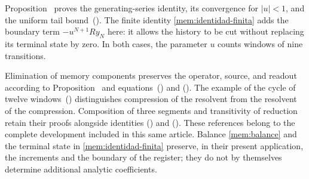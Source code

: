 Proposition~ proves the generating-series
identity, its convergence for \(|u|<1\), and the uniform tail
bound~\textup{()}. The finite identity
\eqref{mem:identidad-finita} adds the boundary term
\(-u^{N+1}Ry_N\) here: it allows the history to be cut without replacing its terminal
state by zero. In both cases, the parameter \(u\) counts windows
of nine transitions.

Elimination of memory components preserves the operator, source,
and readout according to Proposition~ and
equations~\textup{()} and
\textup{()}. The example of the cycle
of twelve windows~\textup{()}
distinguishes compression of the resolvent from the resolvent of the compression.
Composition of three segments and transitivity of reduction
retain their proofs alongside identities
\textup{()} and
\textup{()}.
These references belong to the complete development included in this same
article. Balance \eqref{mem:balance} and the terminal state in
\eqref{mem:identidad-finita} preserve, in their present application,
the increments and the boundary of the register; they do not by themselves
determine additional analytic coefficients.
